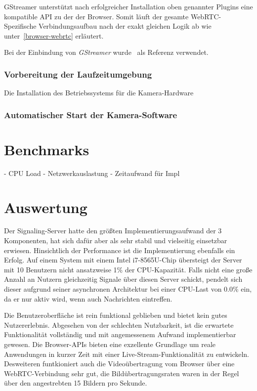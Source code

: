 \documentclass{article}
\begin{document}
\begin{onecolumn}
GStreamer unterstützt nach erfolgreicher Installation oben genannter Plugins
eine kompatible API zu der der Browser. Somit läuft der gesamte
WebRTC-Spezifische Verbindungsaufbau nach der exakt gleichen Logik ab wie
unter\ \ref{browser-webrtc} erläutert.

Bei der Einbindung von \textit{GStreamer} wurde~\cite{GStreamerExamples} als
Referenz verwendet.

\subsubsection{Vorbereitung der Laufzeitumgebung}

Die Installation des Betriebssystems für die Kamera-Hardware 

\subsubsection{Automatischer Start der Kamera-Software}

\section{Benchmarks}

- CPU Load
- Netzwerkauslastung
- Zeitaufwand für Impl

\section{Auswertung}

Der Signaling-Server hatte den größten Implementierungsaufwand der 3
Komponenten, hat sich dafür aber als sehr stabil und vielseitig einsetzbar
erwiesen. Hinsichtlich der Performance ist die Implementierung ebenfalls ein
Erfolg. Auf einem System mit einem Intel i7-8565U-Chip übersteigt der Server
mit 10 Benutzern nicht ansatzweise 1\% der CPU-Kapazität. Falls nicht eine
große Anzahl an Nutzern gleichzeitig Signale über diesen Server schickt,
pendelt sich dieser aufgrund seiner asynchronen Architektur bei einer
CPU-Last von 0.0\% ein, da er nur aktiv wird, wenn auch Nachrichten
eintreffen.

Die Benutzeroberfläche ist rein funktional geblieben und bietet kein gutes
Nutzererlebnis. Abgesehen von der schlechten Nutzbarkeit, ist die erwartete
Funktionalität vollständig und mit angemessenem Aufwand implementierbar
gewesen. Die Browser-APIs bieten eine exzellente Grundlage um reale
Anwendungen in kurzer Zeit mit einer Live-Stream-Funktionalität zu entwickeln.
Desweiteren funtkioniert auch die Videoübertragung vom Browser über eine
WebRTC-Verbindung sehr gut, die Bildübertragungsraten waren in der
Regel über den angestrebten 15 Bildern pro Sekunde.


\end{onecolumn}
\end{document}
